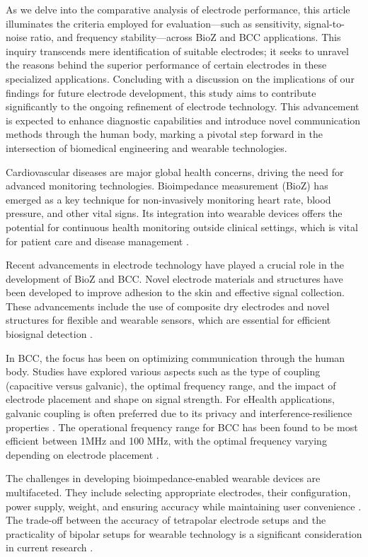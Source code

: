 {As we delve into the comparative analysis of electrode performance, this article illuminates the criteria employed for evaluation—such as sensitivity, signal-to-noise ratio, and frequency stability—across BioZ and BCC applications. This inquiry transcends mere identification of suitable electrodes; it seeks to unravel the reasons behind the superior performance of certain electrodes in these specialized applications. Concluding with a discussion on the implications of our findings for future electrode development, this study aims to contribute significantly to the ongoing refinement of electrode technology. This advancement is expected to enhance diagnostic capabilities and introduce novel communication methods through the human body, marking a pivotal step forward in the intersection of biomedical engineering and wearable technologies.


Cardiovascular diseases are major global health concerns, driving the need for advanced monitoring technologies. Bioimpedance measurement (BioZ) has emerged as a key technique for non-invasively monitoring heart rate, blood pressure, and other vital signs. Its integration into wearable devices offers the potential for continuous health monitoring outside clinical settings, which is vital for patient care and disease management \cite{rabbani2023low, ormanis2020towards, zaira2023prediction}.

Recent advancements in electrode technology have played a crucial role in the development of BioZ and BCC. Novel electrode materials and structures have been developed to improve adhesion to the skin and effective signal collection. These advancements include the use of composite dry electrodes and novel structures for flexible and wearable sensors, which are essential for efficient biosignal detection \cite{lee2021recent}.

In BCC, the focus has been on optimizing communication through the human body. Studies have explored various aspects such as the type of coupling (capacitive versus galvanic), the optimal frequency range, and the impact of electrode placement and shape on signal strength. For eHealth applications, galvanic coupling is often preferred due to its privacy and interference-resilience properties \cite{lapsa2022electrode, shi2024spatially}. The operational frequency range for BCC has been found to be most efficient between 1MHz and 100 MHz, with the optimal frequency varying depending on electrode placement \cite{lapsa2022electrode}.

The challenges in developing bioimpedance-enabled wearable devices are multifaceted. They include selecting appropriate electrodes, their configuration, power supply, weight, and ensuring accuracy while maintaining user convenience \cite{rabbani2023low, ormanis2020towards}. The trade-off between the accuracy of tetrapolar electrode setups and the practicality of bipolar setups for wearable technology is a significant consideration in current research \cite{ormanis2020towards, rabbani2023low}.

}
